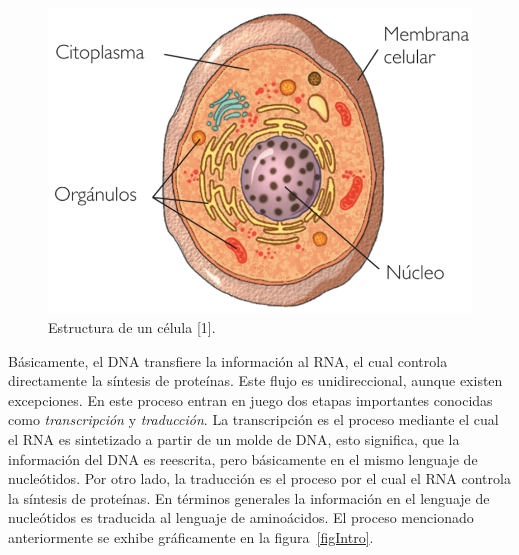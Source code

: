 \begin{figure}[h!]
    \centering
    \includegraphics[scale=0.2]{image/celula.png}
    \caption{Estructura de un célula [1].}    
    \label{fig} 
\end{figure}    

\vskip 1cm
\par Básicamente, el DNA transfiere la información al RNA, el cual controla directamente la síntesis de proteínas. Este flujo es unidireccional, aunque existen excepciones. En este proceso entran en juego dos etapas importantes conocidas como \emph{transcripción} y \emph{traducción}. La transcripción es el proceso mediante el cual el RNA es sintetizado a partir de un molde de DNA, esto significa, que la información del DNA es reescrita, pero básicamente en el mismo lenguaje de nucleótidos. Por otro lado, la traducción es el proceso por el cual el RNA controla la síntesis de proteínas. En términos generales la información en el lenguaje de nucleótidos es traducida al lenguaje de aminoácidos\cite{genetica}. El proceso mencionado anteriormente se exhibe gráficamente en la figura~\ref{figIntro}.

